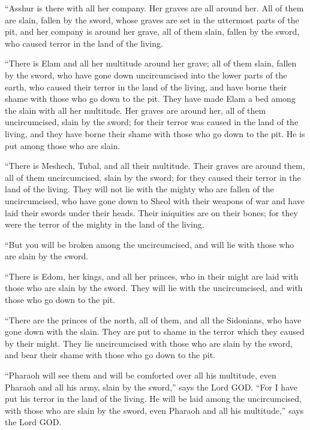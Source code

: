 \myverse{}“Asshur is there with all her company. Her graves are all around
her. All of them are slain, fallen by the sword,
\myverse{}whose graves are set in the uttermost parts of the pit, and her company is
around her grave, all of them slain, fallen by the sword, who caused terror in the land of the living.

\myverse{}“There is Elam and all her multitude around her grave; all of
them slain, fallen by the sword, who have gone down uncircumcised into the lower parts of the earth, who
caused their terror in the land of the living, and have borne their shame with those who go down to the
pit.
\myverse{}They have made Elam a bed among the slain with all her multitude. Her graves
are around her, all of them uncircumcised, slain by the sword; for their terror was caused in the land
of the living, and they have borne their shame with those who go down to the pit. He is put among those
who are slain.

\myverse{}“There is Meshech, Tubal, and all their multitude. Their graves
are around them, all of them uncircumcised, slain by the sword; for they caused their terror in the land
of the living.
\myverse{}They will not lie with the mighty who are fallen of the uncircumcised, who
have gone down to Sheol with their weapons of war and have laid their swords under their heads. Their
iniquities are on their bones; for they were the terror of the mighty in the land of the living.

\myverse{}“But you will be broken among the uncircumcised, and will lie
with those who are slain by the sword.

\myverse{}“There is Edom, her kings, and all her princes, who in their
might are laid with those who are slain by the sword. They will lie with the uncircumcised, and with those
who go down to the pit.

\myverse{}“There are the princes of the north, all of them, and all the
Sidonians, who have gone down with the slain. They are put to shame in the terror which they caused by
their might. They lie uncircumcised with those who are slain by the sword, and bear their shame with those
who go down to the pit.

\myverse{}“Pharaoh will see them and will be comforted over all his multitude,
even Pharaoh and all his army, slain by the sword,” says the Lord GOD.
\myverse{}“For I have put his terror in the land of the living. He will be laid among
the uncircumcised, with those who are slain by the sword, even Pharaoh and all his multitude,” says the
Lord GOD.


